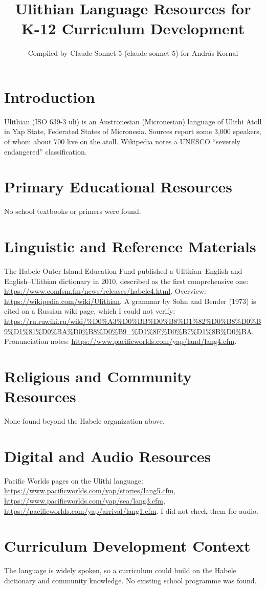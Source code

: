 \documentclass[12pt]{article}
\title{Ulithian Language Resources for K-12 Curriculum Development}
\author{Compiled by Claude Sonnet 5 (claude-sonnet-5) for Andr\'as Kornai}
\date{}
\begin{document}
\maketitle
\section{Introduction}
Ulithian (ISO 639-3 uli) is an Austronesian (Micronesian) language of Ulithi Atoll in Yap State, Federated States of Micronesia. Sources report some 3,000 speakers, of whom about 700 live on the atoll. Wikipedia notes a UNESCO ``severely endangered'' classification.
\section{Primary Educational Resources}
No school textbooks or primers were found.
\section{Linguistic and Reference Materials}
The Habele Outer Island Education Fund published a Ulithian--English and English--Ulithian dictionary in 2010, described as the first comprehensive one: \url{https://www.comfsm.fm/news/releases/habele4.html}. Overview: \url{https://wikipedia.com/wiki/Ulithian}. A grammar by Sohn and Bender (1973) is cited on a Russian wiki page, which I could not verify: \url{https://ru.ruwiki.ru/wiki/%D0%A3%D0%BB%D0%B8%D1%82%D0%B8%D0%B9%D1%81%D0%BA%D0%B8%D0%B9_%D1%8F%D0%B7%D1%8B%D0%BA}. Pronunciation notes: \url{https://www.pacificworlds.com/yap/land/lang4.cfm}.
\section{Religious and Community Resources}
None found beyond the Habele organization above.
\section{Digital and Audio Resources}
Pacific Worlds pages on the Ulithi language: \url{https://www.pacificworlds.com/yap/stories/lang5.cfm}, \url{https://www.pacificworlds.com/yap/sea/lang3.cfm}, \url{https://pacificworlds.com/yap/arrival/lang1.cfm}. I did not check them for audio.
\section{Curriculum Development Context}
The language is widely spoken, so a curriculum could build on the Habele dictionary and community knowledge. No existing school programme was found.
\end{document}
